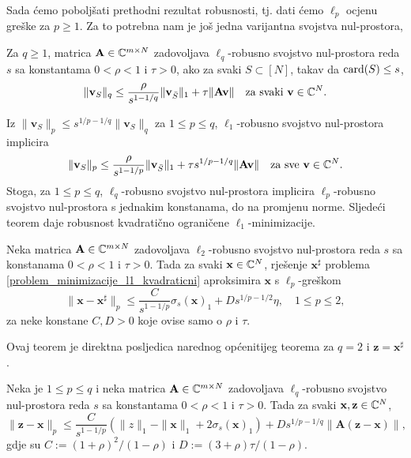 \documentclass[a4paper,twoside,12pt]{memoir} %
\newcommand{\vect}[1]{\mathbf{#1}}
\renewcommand{\vec}{\vect}
\newcommand{\card}{\text{\normalfont{card}}}
\newcommand{\norm}[1]{\|{#1}\|}
\begin{document}
Sada \'cemo pobolj\v{s}ati prethodni rezultat robusnosti, tj. dati \'cemo $\ell_p$ ocjenu gre\v{s}ke za $p \geq 1$. Za to potrebna nam je jo\v{s} jedna varijantna svojstva nul-prostora,
\begin{defn}
    Za $q \geq 1$, matrica $\vec A \in \C^{m \times N}$ zadovoljava $\ell_q$-robusno svojstvo nul-prostora reda $s$ sa konstantama $0 < \rho < 1$ i $\tau > 0$, ako za svaki $S \subset [N]$, takav da $\card(S) \leq s$,
    \begin{equation*}
        \norm{\vec v_S}_q \leq \frac{\rho}{s^{1-1/q}}\norm{\vec v_{\bar S}}_1 + \tau \norm{\vec{Av}}\quad \text{za svaki }\vec{v} \in \C^N.
    \end{equation*}
\end{defn}
\noindent Iz $\norm{\vec v_S}_p \leq s^{1/p - 1/q}\norm{\vec v_S}_q$ za $1 \leq p \leq q$, $\ell_1$-robusno svojstvo nul-prostora implicira
\begin{equation*}
    \norm{\vec v_S}_p \leq \frac{\rho}{s^{1-1/p}}\norm{\vec v_{\bar S}}_1 + \tau s^{1/p-1/q}\norm{\vec{Av}} \quad \text{za sve } \vec v \in \C^N.
\end{equation*}
Stoga, za $1 \leq p \leq q$, $\ell_q$-robusno svojstvo nul-prostora implicira $\ell_p$-robusno svojstvo nul-prostora s jednakim konstanama, do na promjenu norme. Sljede\'ci teorem daje robusnost kvadrati\v{c}no ograni\v{c}ene $\ell_1$-minimizacije.
\begin{thm}\label{robusnost_l1_min_kvad_ogr}
    Neka matrica $\vec A \in \C^{m \times N}$  zadovoljava $\ell_2$-robusno svojstvo nul-prostora reda $s$ sa konstanama $0<\rho<1$ i $\tau >0$. Tada za svaki $\vec x \in \C^N$, rje\v{s}enje $\vec x^{\sharp}$ problema \eqref{problem_minimizacije_l1_kvadraticni} aproksimira $\vec x$ s $\ell_p$-gre\v{s}kom
    \begin{equation}
        \norm{\vec x - \vec x^{\sharp}}_p \leq \frac{C}{s^{1-1/p}} \sigma_s(\vec x)_1 + D s^{1/p - 1/2} \eta, \quad 1 \leq p \leq 2,
    \end{equation}
    za neke konstane $C,D > 0$ koje ovise samo o $\rho$ i $\tau$.
\end{thm}
Ovaj teorem je direktna posljedica narednog op\'cenitijeg teorema za $q = 2$ i $\vec z = \vec x^{\sharp}$.
\begin{thm}
    Neka je $1 \leq p \leq q$ i neka matrica $\vec A \in \C^{m \times N}$ zadovoljava $\ell_q$-robusno svojstvo nul-prostora reda $s$ sa konstantama $0 < \rho < 1$ i $\tau > 0$. Tada za svaki $\vec x, \vec z \in \C^N$,
    \begin{equation*}
        \norm{\vec z - \vec x}_p \leq \frac{C}{s^{1-1/p}}(\norm{z}_1 - \norm{\vec x}_1 + 2 \sigma_s(\vec x)_1) + D s^{1/p-1/q} \norm{\vec A (\vec z - \vec x)},
    \end{equation*}
    gdje su $C:=(1+\rho)^2/(1-\rho)$ i $D:=(3+\rho)\tau/(1-\rho)$.
\end{thm}
\end{document}
